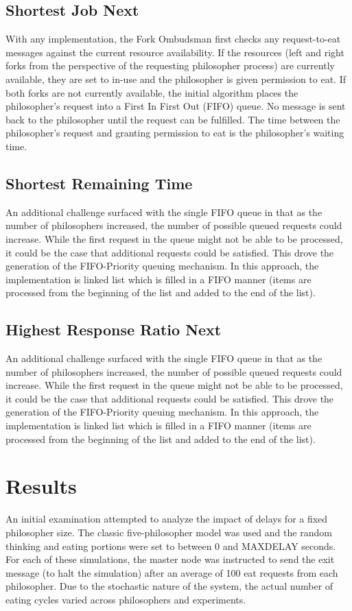 \documentclass[conference,11pt]{IEEEtran}
\begin{document}
\subsection{Shortest Job Next}
With any implementation, the Fork Ombudsman first checks any request-to-eat messages against the current resource availability. If the resources (left and right forks from the perspective of the requesting philosopher process) are currently available, they are set to in-use and the philosopher is given permission to eat. If both forks are not currently available, the initial algorithm places the philosopher's request into a First In First Out (FIFO) queue. No message is sent back to the philosopher until the request can be fulfilled. The time between the philosopher's request and granting permission to eat is the philosopher's waiting time.

\subsection{Shortest Remaining Time}
An additional challenge surfaced with the single FIFO queue in that as the number of philosophers increased, the number of possible queued requests could increase. While the first request in the queue might not be able to be processed, it could be the case that additional requests could be satisfied. This drove the generation of the FIFO-Priority queuing mechanism. In this approach, the implementation is linked list which is filled in a FIFO manner (items are processed from the beginning of the list and added to the end of the list).

\subsection{Highest Response Ratio Next}
An additional challenge surfaced with the single FIFO queue in that as the number of philosophers increased, the number of possible queued requests could increase. While the first request in the queue might not be able to be processed, it could be the case that additional requests could be satisfied. This drove the generation of the FIFO-Priority queuing mechanism. In this approach, the implementation is linked list which is filled in a FIFO manner (items are processed from the beginning of the list and added to the end of the list).

\section{Results}
An initial examination attempted to analyze the impact of delays for a fixed philosopher size. The classic five-philosopher model was used and the random thinking and eating portions were set to between 0 and MAXDELAY seconds. For each of these simulations, the master node was instructed to send the exit message (to halt the simulation) after an average of 100 eat requests from each philosopher. Due to the stochastic nature of the system, the actual number of eating cycles varied across philosophers and experiments.
\end{document}
